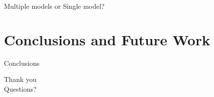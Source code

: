 \documentclass[handout]{beamer}
\begin{document}
%

\begin{frame}{Multiple models or Single model?}

\end{frame}

\section{Conclusions and Future Work}
\begin{frame}{Conclusions}

\end{frame}

\begin{frame}
\huge{Thank you}\\
\huge{Questions?}\\
\end{frame}
\end{document}

